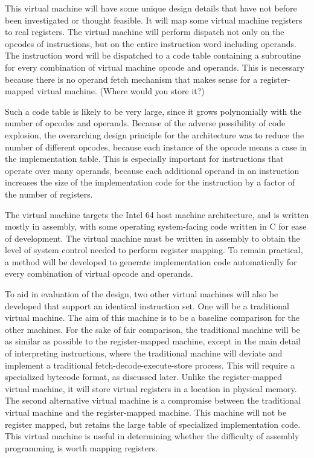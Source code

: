 \documentclass[A4]{sig-alternate}
\begin{document}
This virtual machine will have some unique design details that have not before been investigated or thought feasible. It will map some virtual machine registers to real registers. The virtual machine will perform dispatch not only on the opcodes of instructions, but on the entire instruction word including operands. The instruction word will be dispatched to a code table containing a subroutine for every combination of virtual machine opcode and operands. This is necessary because there is no operand fetch mechanism that makes sense for a register-mapped virtual machine. (Where would you store it?)

Such a code table is likely to be very large, since it grows polynomially with the number of opcodes and operands. Because of the adverse possibility of code explosion, the overarching design principle for the architecture was to reduce the number of different opcodes, because each instance of the opcode means a case in the implementation table. This is especially important for instructions that operate over many operands, because each additional operand in an instruction increases the size of the implementation code for the instruction by a factor of the number of registers.

The virtual machine targets the Intel 64 host machine architecture, and is written mostly in assembly, with some operating system-facing code written in C for ease of development. The virtual machine must be written in assembly to obtain the level of system control needed to perform register mapping. To remain practical, a method will be developed to generate implementation code automatically for every combination of virtual opcode and operands.

To aid in evaluation of the design, two other virtual machines will also be developed that support an identical instruction set. One will be a traditional virtual machine. The aim of this machine is to be a baseline comparison for the other machines. For the sake of fair comparison, the traditional machine will be as similar as possible to the register-mapped machine, except in the main detail of interpreting instructions, where the traditional machine will deviate and implement a traditional fetch-decode-execute-store process. This will require a specialized bytecode format, as discussed later. Unlike the register-mapped virtual machine, it will store virtual registers in a location in physical memory. The second alternative virtual machine is a compromise between the traditional virtual machine and the register-mapped machine. This machine will not be register mapped, but retains the large table of specialized implementation code. This virtual machine is useful in determining whether the difficulty of assembly programming is worth mapping registers.
\end{document}
